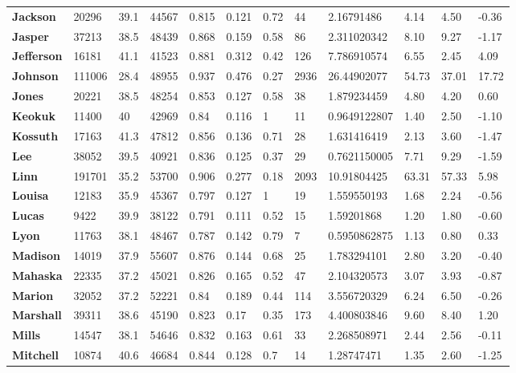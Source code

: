 \documentclass[11pt]{article}
\begin{document}
\begin{table}[H]
\begin{tabular}{llllllllllll}
\textbf{Jackson} & 20296 & 39.1 & 44567 & 0.815 & 0.121 & 0.72 & 44 & 2.16791486 & 4.14 & 4.50 & -0.36 \\
\textbf{Jasper} & 37213 & 38.5 & 48439 & 0.868 & 0.159 & 0.58 & 86 & 2.311020342 & 8.10 & 9.27 & -1.17 \\
\textbf{Jefferson} & 16181 & 41.1 & 41523 & 0.881 & 0.312 & 0.42 & 126 & 7.786910574 & 6.55 & 2.45 & 4.09 \\
\textbf{Johnson} & 111006 & 28.4 & 48955 & 0.937 & 0.476 & 0.27 & 2936 & 26.44902077 & 54.73 & 37.01 & 17.72 \\
\textbf{Jones} & 20221 & 38.5 & 48254 & 0.853 & 0.127 & 0.58 & 38 & 1.879234459 & 4.80 & 4.20 & 0.60 \\
\textbf{Keokuk} & 11400 & 40 & 42969 & 0.84 & 0.116 & 1 & 11 & 0.9649122807 & 1.40 & 2.50 & -1.10 \\
\textbf{Kossuth} & 17163 & 41.3 & 47812 & 0.856 & 0.136 & 0.71 & 28 & 1.631416419 & 2.13 & 3.60 & -1.47 \\
\textbf{Lee} & 38052 & 39.5 & 40921 & 0.836 & 0.125 & 0.37 & 29 & 0.7621150005 & 7.71 & 9.29 & -1.59 \\
\textbf{Linn} & 191701 & 35.2 & 53700 & 0.906 & 0.277 & 0.18 & 2093 & 10.91804425 & 63.31 & 57.33 & 5.98 \\
\textbf{Louisa} & 12183 & 35.9 & 45367 & 0.797 & 0.127 & 1 & 19 & 1.559550193 & 1.68 & 2.24 & -0.56 \\
\textbf{Lucas} & 9422 & 39.9 & 38122 & 0.791 & 0.111 & 0.52 & 15 & 1.59201868 & 1.20 & 1.80 & -0.60 \\
\textbf{Lyon} & 11763 & 38.1 & 48467 & 0.787 & 0.142 & 0.79 & 7 & 0.5950862875 & 1.13 & 0.80 & 0.33 \\
\textbf{Madison} & 14019 & 37.9 & 55607 & 0.876 & 0.144 & 0.68 & 25 & 1.783294101 & 2.80 & 3.20 & -0.40 \\
\textbf{Mahaska} & 22335 & 37.2 & 45021 & 0.826 & 0.165 & 0.52 & 47 & 2.104320573 & 3.07 & 3.93 & -0.87 \\
\textbf{Marion} & 32052 & 37.2 & 52221 & 0.84 & 0.189 & 0.44 & 114 & 3.556720329 & 6.24 & 6.50 & -0.26 \\
\textbf{Marshall} & 39311 & 38.6 & 45190 & 0.823 & 0.17 & 0.35 & 173 & 4.400803846 & 9.60 & 8.40 & 1.20 \\
\textbf{Mills} & 14547 & 38.1 & 54646 & 0.832 & 0.163 & 0.61 & 33 & 2.268508971 & 2.44 & 2.56 & -0.11 \\
\textbf{Mitchell} & 10874 & 40.6 & 46684 & 0.844 & 0.128 & 0.7 & 14 & 1.28747471 & 1.35 & 2.60 & -1.25 \\

\end{tabular}
\end{table}
\end{document}
